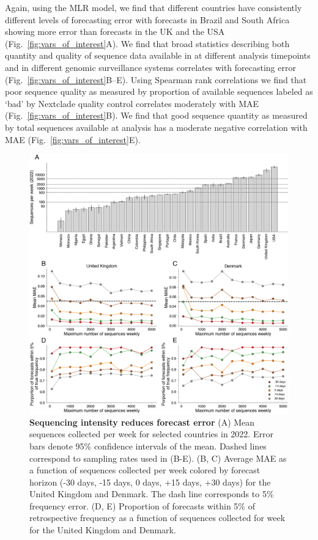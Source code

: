 \documentclass[11pt,oneside,letterpaper]{article}
\begin{document}
Again, using the MLR model, we find that different countries have consistently different levels of forecasting error with forecasts in Brazil and South Africa showing more error than forecasts in the UK and the USA  (Fig.~\ref{fig:vars_of_interest}A).
We find that broad statistics describing both quantity and quality of sequence data available in at different analysis timepoints and in different genomic surveillance systems correlates with forecasting error (Fig.~\ref{fig:vars_of_interest}B--E).
Using Spearman rank correlations we find that poor sequence quality as measured by proportion of available sequences labeled as `bad' by Nextclade quality control \cite{aksamentov2021nextclade} correlates moderately with MAE (Fig.~\ref{fig:vars_of_interest}B).
We find that good sequence quantity as measured by total sequences available at analysis has a moderate negative correlation with MAE (Fig.~\ref{fig:vars_of_interest}E).

\begin{figure}[tb!]
    \centering
    \includegraphics[width=1.0\linewidth]{figures/downscaling_sequencing.png}
    \caption{
			\textbf{Sequencing intensity reduces forecast error}
    	(A) Mean sequences collected per week for selected countries in 2022.
			Error bars denote 95\% confidence intervals of the mean.
			Dashed lines correspond to sampling rates used in (B-E).
    	(B, C) Average MAE as a function of sequences collected per week colored by forecast horizon (-30 days, -15 days, 0 days, +15 days, +30 days) for the United Kingdom and Denmark.
			The dash line corresponds to 5\% frequency error.
    	(D, E) Proportion of forecasts within 5\% of retrospective frequency as a function of sequences collected for week for the United Kingdom and Denmark.
  	}
    \label{fig:downscaling}
\end{figure}
\end{document}
